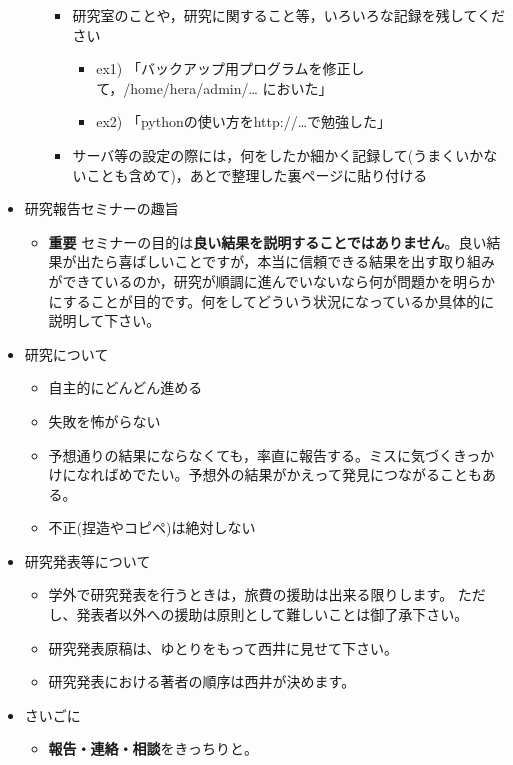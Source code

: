 \documentclass[11pt, ]{jsarticle}
\providecommand{\tightlist}{%
   \setlength{\itemsep}{0pt}\setlength{\parskip}{0pt}}
\begin{document}
\begin{itemize}
\begin{itemize}
    \begin{itemize}
    \tightlist
    \item
      研究室のことや，研究に関すること等，いろいろな記録を残してください

      \begin{itemize}
      \tightlist
      \item
        ex1)
        「バックアップ用プログラムを修正して，/home/hera/admin/\ldots{}
        においた」
      \item
        ex2) 「pythonの使い方をhttp://\ldots で勉強した」
      \end{itemize}
    \item
      サーバ等の設定の際には，何をしたか細かく記録して(うまくいかないことも含めて)，あとで整理した裏ページに貼り付ける
    \end{itemize}
  \end{itemize}
\item
  研究報告セミナーの趣旨

  \begin{itemize}
  \tightlist
  \item
    \textbf{重要}
    セミナーの目的は\textbf{良い結果を説明することではありません}。良い結果が出たら喜ばしいことですが，本当に信頼できる結果を出す取り組みができているのか，研究が順調に進んでいないなら何が問題かを明らかにすることが目的です。何をしてどういう状況になっているか具体的に説明して下さい。
  \end{itemize}
\item
  研究について

  \begin{itemize}
  \tightlist
  \item
    自主的にどんどん進める
  \item
    失敗を怖がらない
  \item
    予想通りの結果にならなくても，率直に報告する。ミスに気づくきっかけになればめでたい。予想外の結果がかえって発見につながることもある。
  \item
    不正(捏造やコピペ)は絶対しない
  \end{itemize}
\item
  研究発表等について

  \begin{itemize}
  \tightlist
  \item
    学外で研究発表を行うときは，旅費の援助は出来る限りします。
    ただし、発表者以外への援助は原則として難しいことは御了承下さい。
  \item
    研究発表原稿は、ゆとりをもって西井に見せて下さい。
  \item
    研究発表における著者の順序は西井が決めます。
  \end{itemize}
\item
  さいごに

  \begin{itemize}
  \tightlist
  \item
    \textbf{報告・連絡・相談}をきっちりと。
  \end{itemize}
\end{itemize}
\end{document}

